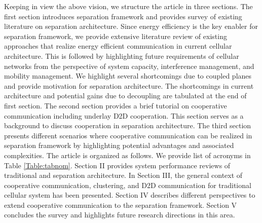 \documentclass[article,10pt,twocolumn]{IEEEtran}
\begin{document}
Keeping in view the above vision, we structure the article in three sections. The first section introduces separation framework and provides survey of existing literature on separation architecture. Since energy efficiency is the key enabler for separation framework, we provide extensive literature review of existing approaches that realize energy efficient communication in current cellular architecture. This is followed by highlighting future requirements of cellular networks from the perspective of system capacity, interference management, and mobility management. We highlight several shortcomings due to coupled planes and provide motivation for separation architecture. The shortcomings in current architecture and potential gains due to decoupling are tabulated at the end of first section. The second section provides a brief tutorial on cooperative communication including underlay D2D cooperation. This section serves as a background to discuss cooperation in separation architecture. The third section presents different scenarios where cooperative communication can be realized in separation framework by highlighting potential advantages and associated complexities. The article is organized as follows. We provide list of acronyms in Table \ref{Table:tabnom}. Section II  provides system performance reviews of traditional and separation architecture. In Section III, the general context of cooperative communication, clustering, and D2D communication for traditional cellular system has been presented. Section IV describes different perspectives to extend cooperative communication to the separation framework. Section V concludes the survey and highlights future research directions in this area.
\end{document}
